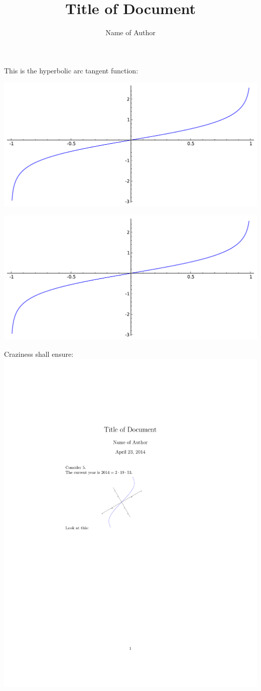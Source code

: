 \documentclass{article}
\title{Title of Document}
\author{Name of Author}
\begin{document}
\maketitle

This is the hyperbolic arc tangent function:

\begin{center}
\includegraphics[width=.8\textwidth]{arctanh}
\end{center}

\hspace{-2in}
\includegraphics{arctanh}

Craziness shall ensure:
\includegraphics{awesome-plots-sagetex}
\end{document}
